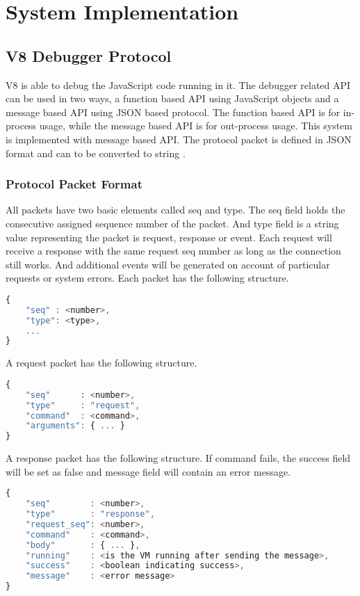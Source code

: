 \chapter {System Implementation}
\label {System Implementation}

\section {V8 Debugger Protocol}
V8 is able to debug the JavaScript code running in it. The debugger related API can be used in two ways, a function based API using JavaScript objects and a message based API using JSON based protocol. The function based API is for in-process usage, while the message based API is for out-process usage. This system is implemented with message based API. The protocol packet is defined in JSON format and can to be converted to string \cite{V8}.

\subsection {Protocol Packet Format}
All packets have two basic elements called seq and type. The seq field holds the consecutive assigned sequence number of the packet. And type field is a string value representing the packet is request, response or event. Each request will receive a response with the same request seq number as long as the connection still works. And additional events will be generated on account of particular requests or system errors. Each packet has the following structure.

\begin{lstlisting}[language=JavaScript]
{
	"seq" : <number>,
	"type": <type>,
	...
}
\end{lstlisting}

A request packet has the following structure.

\begin{lstlisting}[language=JavaScript]
{
	"seq"      : <number>,
	"type"     : "request",
	"command"  : <command>,
	"arguments": { ... }
}
\end{lstlisting}

A response packet has the following structure. If command fails, the success field will be set as false and message field will contain an error message.

\begin{lstlisting}[language=JavaScript]
{
	"seq"        : <number>,
	"type"       : "response",
	"request_seq": <number>,
	"command"    : <command>,
	"body"       : { ... },
	"running"    : <is the VM running after sending the message>,
	"success"    : <boolean indicating success>,
	"message"    : <error message>
}
\end{lstlisting}

